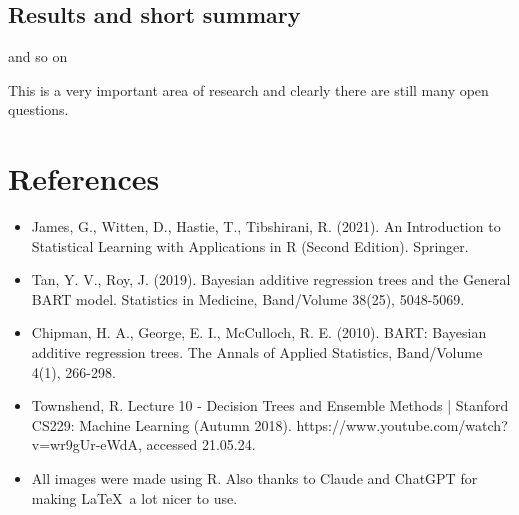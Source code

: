 \documentclass[12pt]{article}
\begin{document}
 

\subsection{Results and short summary}
and so on



This is a very important area of research and clearly there are still many open questions.


 \section{References}
\begin{itemize}
    \item James, G., Witten, D., Hastie, T., Tibshirani, R. (2021). An Introduction to Statistical Learning with Applications in R (Second Edition). Springer.
    \item Tan, Y. V., Roy, J. (2019). Bayesian additive regression trees and the General BART model. Statistics in Medicine, Band/Volume 38(25), 5048-5069.
    \item Chipman, H. A., George, E. I., McCulloch, R. E. (2010). BART: Bayesian additive regression trees. The Annals of Applied Statistics, Band/Volume 4(1), 266-298.
    \item Townshend, R. Lecture 10 - Decision Trees and Ensemble Methods | Stanford CS229: Machine Learning (Autumn 2018). https://www.youtube.com/watch?v=wr9gUr-eWdA, accessed 21.05.24.
    \item All images were made using R. Also thanks to Claude and ChatGPT for making \LaTeX\ a lot nicer to use.
\end{itemize}
\end{document}

